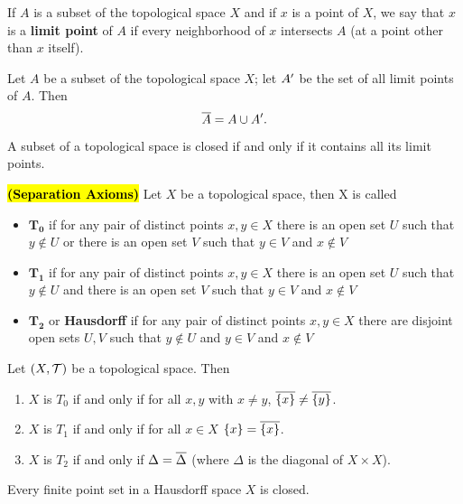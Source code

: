 \vs

\dfn If $A$ is a subset of the topological space $X$ and if $x$ is a point of $X$, we say that $x$ is a \textbf{limit point} of $A$ if every neighborhood of $x$ intersects $A$ (at a point other than $x$ itself).


\vs

\begin{thm}
Let $A$ be a subset of the topological space $X$; let $A^\prime$ be the set of all limit points of $A$. Then
\[\overline A = A\cup A^\prime.\]
\end{thm}

\vs

\begin{cor}
A subset of a topological space is closed if and only if it contains all its limit points.
\end{cor}

\vs

\dfn\textbf{\hl{(Separation Axioms)}} Let $X$ be a topological space, then X is called
\begin{itemize}
    \item $\boldsymbol{T_0}$ if for any pair of distinct points $x,y\in X$ there is an open set $U$ such that $y\nin U$ or there is an open set $V$ such that $y\in V$ and $x\nin V$
    \item $\boldsymbol{T_1}$ if for any pair of distinct points $x,y\in X$ there is an open set $U$ such that $y\nin U$ and there is an open set $V$ such that $y\in V$ and $x\nin V$
    \item $\boldsymbol{T_2}$ or \textbf{Hausdorff} if for any pair of distinct points $x,y\in X$ there are disjoint open sets $U, V$ such that $y\nin U$ and $y\in V$ and $x\nin V$
\end{itemize}

\vs

 Let $(X,\mathcal{T})$ be a topological space. Then
\begin{enumerate}
    \item $X$ is $T_0$ if and only if for all $x,y$ with $x\neq y$, $\overline{\{x\}} \neq \overline{\{y\}}$.
    \item $X$ is $T_1$ if and only if for all $x\in X$ $\{x\} = \overline{\{x\}}$.
    \item $X$ is $T_2$ if and only if $\Delta = \overline \Delta$ (where $\Delta$ is the diagonal of $X\times X$).
\end{enumerate}


\vs

\begin{thm}
Every finite point set in a Hausdorff space $X$ is closed.
\end{thm}

